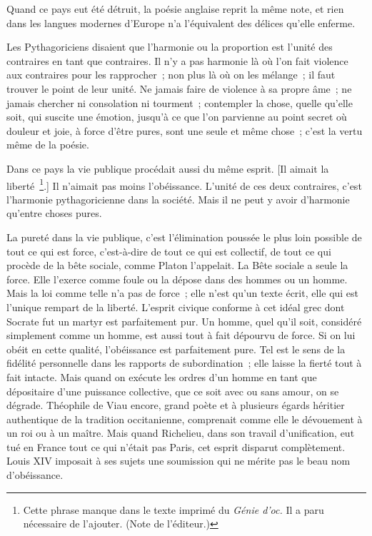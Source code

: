 \documentclass[french,twoside]{book} %
\begin{document}
\noindent Quand ce pays eut été détruit, la poésie anglaise reprit la même note, et rien dans les langues modernes d'Europe n'a l'équivalent des délices qu'elle enferme.\par
Les Pythagoriciens disaient que l'harmonie ou la proportion est l'unité des contraires en tant que contraires. Il n'y a pas harmonie là où l'on fait violence aux contraires pour les rapprocher ; non plus là où on les mélange ; il faut trouver le point de leur unité. Ne jamais faire de violence à sa propre âme ; ne jamais chercher ni consolation ni tourment ; contempler la chose, quelle qu'elle soit, qui suscite une émotion, jusqu'à ce que l'on parvienne au point secret où douleur et joie, à force d'être pures, sont une seule et même chose ; c'est la vertu même de la poésie.\par
Dans ce pays la vie publique procédait aussi du même esprit. [Il aimait la liberté \footnote{ Cette phrase manque dans le texte imprimé du {\itshape Génie d'oc.} Il a paru nécessaire de l'ajouter. (Note de l'éditeur.)}.] Il n'aimait pas moins l'obéissance. L'unité de ces deux contraires, c'est l'harmonie pythagoricienne dans la société. Mais il ne peut y avoir d'harmonie qu'entre choses pures.\par
La pureté dans la vie publique, c'est l'élimination poussée le plus loin possible de tout ce qui est force, c'est-à-dire de tout ce qui est collectif, de tout ce qui procède de la bête sociale, comme Platon l'appelait. La Bête sociale a seule la force. Elle l'exerce comme foule ou la dépose dans des hommes ou un homme. Mais la loi comme telle n'a pas de force ; elle n'est qu'un texte écrit, elle qui est l'unique rempart de la liberté. L'esprit civique conforme à cet idéal grec dont Socrate fut un martyr est parfaitement pur. Un homme, quel qu'il soit, considéré simplement comme un homme, est aussi tout à fait dépourvu de force. Si on lui obéit en cette qualité, l'obéissance est parfaitement pure. Tel est le sens de la fidélité personnelle dans les rapports de subordination ; elle laisse la fierté tout à fait intacte. Mais quand on exécute les ordres d'un homme en tant que dépositaire d'une puissance collective, que ce soit avec ou sans amour, on se dégrade. Théophile de Viau encore, grand poète et à plu­sieurs égards héritier authentique de la tradition occitanienne, comprenait comme elle le dévouement à un roi ou à un maître. Mais quand Richelieu, dans son travail d'unification, eut tué en France tout ce qui n'était pas Paris, cet esprit disparut complètement. Louis XIV imposait à ses sujets une soumis­sion qui ne mérite pas le beau nom d'obéissance.\par
\end{document}
